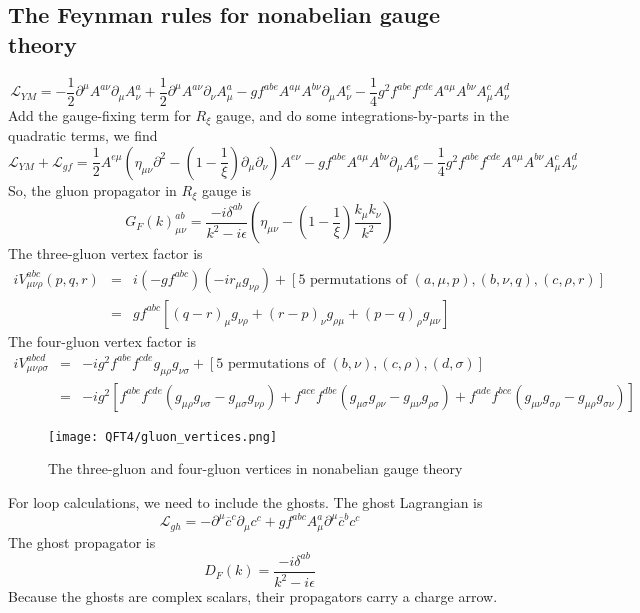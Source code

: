 \subsection{The Feynman rules for nonabelian gauge theory}
\[\mathcal{L}_{YM} = -\frac{1}{2}\partial^{\mu}A^{a\nu} \partial_{\mu}A^a_{\nu} + \frac{1}{2}\partial^{\mu}A^{a\nu} \partial_{\nu}A^a_{\mu} -gf^{abe}A^{a\mu}A^{b\nu}\partial_{\mu}A^e_{\nu} - \frac{1}{4}g^2 f^{abe}f^{cde}A^{a\mu}A^{b\nu}A^c_{\mu}A^d_{\nu}\]
Add the gauge-fixing term for $R_{\xi}$ gauge, and do some integrations-by-parts in the quadratic terms, we find
\[\mathcal{L}_{YM} + \mathcal{L}_{gf} = \frac{1}{2}A^{e\mu}(\eta_{\mu\nu}\partial^2 -(1-\frac{1}{\xi}) \partial_{\mu}\partial_{\nu})A^{e\nu} -gf^{abe}A^{a\mu}A^{b\nu}\partial_{\mu}A^e_{\nu} - \frac{1}{4}g^2 f^{abe}f^{cde}A^{a\mu}A^{b\nu}A^c_{\mu}A^d_{\nu}\]
So, the gluon propagator in $R_{\xi}$ gauge is
\[G_F(k)^{ab}_{\mu\nu} = \frac{-i\delta^{ab}}{k^2-i\epsilon} \left( \eta_{\mu\nu} - (1 - \frac{1}{\xi}) \frac{k_{\mu}k_{\nu}}{k^2} \right)\]
The three-gluon vertex factor is
\begin{eqnarray}
iV^{abc}_{\mu\nu\rho}(p,q,r) &=& i (-gf^{abc})(-ir_{\mu}g_{\nu\rho}) + [5 \mbox{ permutations of } (a,\mu,p),(b,\nu,q),(c,\rho,r)] \nonumber \\
&=& gf^{abc}[(q-r)_{\mu}g_{\nu\rho} + (r-p)_{\nu}g_{\rho\mu} + (p-q)_{\rho}g_{\mu\nu}] \nonumber
\end{eqnarray}
The four-gluon vertex factor is
\begin{eqnarray}
iV^{abcd}_{\mu\nu\rho\sigma} &=& -ig^2f^{abe} f^{cde} g_{\mu\rho}g_{\nu\sigma} + [5 \mbox{ permutations of } (b,\nu),(c,\rho),(d,\sigma)] \nonumber \\
&=& -ig^2 [f^{abe}f^{cde}(g_{\mu\rho}g_{\nu\sigma} - g_{\mu\sigma}g_{\nu\rho}) + f^{ace}f^{dbe}(g_{\mu\sigma}g_{\rho\nu} - g_{\mu\nu}g_{\rho\sigma}) + f^{ade}f^{bce}(g_{\mu\nu}g_{\sigma\rho} - g_{\mu\rho}g_{\sigma\nu})] \nonumber
\end{eqnarray}

\begin{figure}[!h]
	\centering
	\texttt{[image: QFT4/gluon\_vertices.png]}
	\caption{The three-gluon and four-gluon vertices in nonabelian gauge theory}
\end{figure}

\noindent
For loop calculations, we need to include the ghosts. The ghost Lagrangian is
\[\mathcal{L}_{gh} = -\partial^{\mu}\overline{c}^c \partial_{\mu}c^c + gf^{abc}A^a_{\mu}\partial^{\mu}\overline{c}^b c^c\]
The ghost propagator is
\[D_F(k) = \frac{-i\delta^{ab}}{k^2-i\epsilon}\]
Because the ghosts are complex scalars, their propagators carry a charge arrow. 

